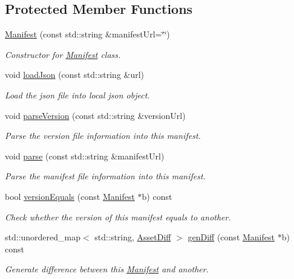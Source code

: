 \subsection*{Protected Member Functions}
\begin{DoxyCompactItemize}
\item 
\hyperlink{classManifest_ab824b9e77f3381d19a7f32db41840da7}{Manifest} (const std\+::string \&manifest\+Url=\char`\"{}\char`\"{})
\begin{DoxyCompactList}\small\item\em Constructor for \hyperlink{classManifest}{Manifest} class. \end{DoxyCompactList}\item 
void \hyperlink{classManifest_a47aa1ad3edc161e420109489ce36823f}{load\+Json} (const std\+::string \&url)
\begin{DoxyCompactList}\small\item\em Load the json file into local json object. \end{DoxyCompactList}\item 
void \hyperlink{classManifest_adf48429fda66eba3c19db8fc09f7f6d2}{parse\+Version} (const std\+::string \&version\+Url)
\begin{DoxyCompactList}\small\item\em Parse the version file information into this manifest. \end{DoxyCompactList}\item 
void \hyperlink{classManifest_abbaa9d1b3e86c2ff26d60a4d94209cd7}{parse} (const std\+::string \&manifest\+Url)
\begin{DoxyCompactList}\small\item\em Parse the manifest file information into this manifest. \end{DoxyCompactList}\item 
bool \hyperlink{classManifest_acafa28b00d8f3776432ce9b6b034214f}{version\+Equals} (const \hyperlink{classManifest}{Manifest} $\ast$b) const
\begin{DoxyCompactList}\small\item\em Check whether the version of this manifest equals to another. \end{DoxyCompactList}\item 
std\+::unordered\+\_\+map$<$ std\+::string, \hyperlink{structManifest_1_1AssetDiff}{Asset\+Diff} $>$ \hyperlink{classManifest_a2c495778109f2ecfd8449e061f696f0c}{gen\+Diff} (const \hyperlink{classManifest}{Manifest} $\ast$b) const
\begin{DoxyCompactList}\small\item\em Generate difference between this \hyperlink{classManifest}{Manifest} and another. \end{DoxyCompactList}\item 

\end{DoxyCompactItemize}
